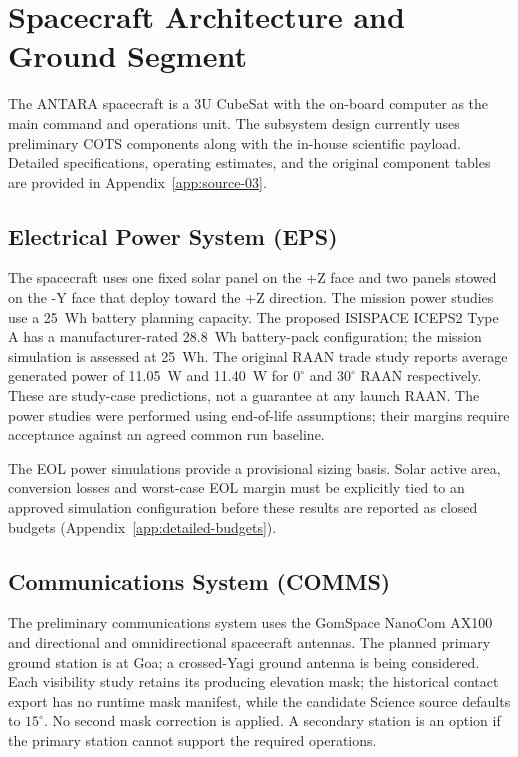 \section{Spacecraft Architecture and Ground Segment}\label{spacecraft-architecture}
The ANTARA spacecraft is a 3U CubeSat with the on-board computer as the main command and operations unit. The subsystem design currently uses preliminary COTS components along with the in-house scientific payload. Detailed specifications, operating estimates, and the original component tables are provided in Appendix~\ref{app:source-03}.

\subsection{Electrical Power System (EPS)}\label{electrical-power-system-eps}
The spacecraft uses one fixed solar panel on the +Z face and two panels stowed on the -Y face that deploy toward the +Z direction. The mission power studies use a 25~Wh battery planning capacity. The proposed ISISPACE ICEPS2 Type A has a manufacturer-rated 28.8~Wh battery-pack configuration; the mission simulation is assessed at 25~Wh. The original RAAN trade study reports average generated power of 11.05~W and 11.40~W for $0^\circ$ and $30^\circ$ RAAN respectively. These are study-case predictions, not a guarantee at any launch RAAN. The power studies were performed using end-of-life assumptions; their margins require acceptance against an agreed common run baseline.

The EOL power simulations provide a provisional sizing basis. Solar active area, conversion losses and worst-case EOL margin must be explicitly tied to an approved simulation configuration before these results are reported as closed budgets (Appendix~\ref{app:detailed-budgets}).

\subsection{Communications System (COMMS)}\label{communications-system-comms}
The preliminary communications system uses the GomSpace NanoCom AX100 and directional and omnidirectional spacecraft antennas. The planned primary ground station is at Goa; a crossed-Yagi ground antenna is being considered. Each visibility study retains its producing elevation mask; the historical contact export has no runtime mask manifest, while the candidate Science source defaults to $15^\circ$. No second mask correction is applied. A secondary station is an option if the primary station cannot support the required operations.

